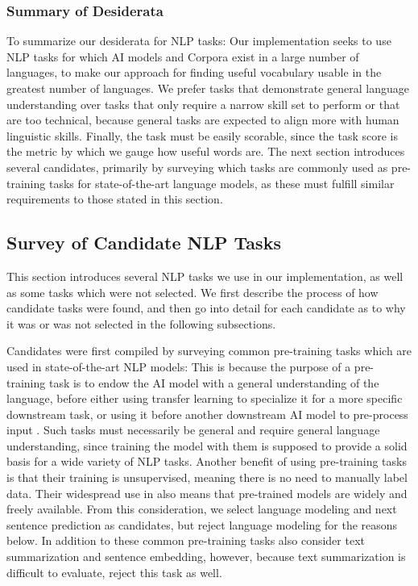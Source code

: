 \subsubsection{Summary of Desiderata}
To summarize our desiderata for NLP tasks:
Our implementation seeks to use NLP tasks for which AI models and Corpora exist in a large number of languages, to make our approach for finding useful vocabulary usable in the greatest number of languages.
We prefer tasks that demonstrate general language understanding over tasks that only require a narrow skill set to perform or that are too technical, because general tasks are expected to align more with human linguistic skills.
Finally, the task must be easily scorable, since the task score is the metric by which we gauge how useful words are.
The next section introduces several candidates, primarily by surveying which tasks are commonly used as pre-training tasks for state-of-the-art language models, as these must fulfill similar requirements to those stated in this section.

\subsection{Survey of Candidate NLP Tasks}
This section introduces several NLP tasks we use in our implementation, as well as some tasks which were not selected.
We first describe the process of how candidate tasks were found, and then go into detail for each candidate as to why it was or was not selected in the following subsections.

Candidates were first compiled by surveying common pre-training tasks which are used in state-of-the-art NLP models:
This is because the purpose of a pre-training task is to endow the AI model with a general understanding of the language, before either using transfer learning to specialize it for a more specific downstream task, or using it before another downstream AI model to pre-process input \cite{jurafskySpeechLanguageProcessing2025a}.
Such tasks must necessarily be general and require general language understanding, since training the model with them is supposed to provide a solid basis for a wide variety of NLP tasks.
Another benefit of using pre-training tasks is that their training is unsupervised, meaning there is no need to manually label data.
Their widespread use in \NLP also means that pre-trained models are widely and freely available.
From this consideration, we select language modeling and next sentence prediction as candidates, but reject language modeling for the reasons below.
In addition to these common pre-training tasks also consider text summarization and sentence embedding, however, because text summarization is difficult to evaluate, reject this task as well.

